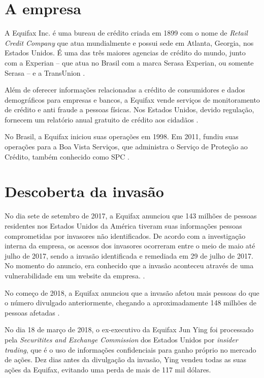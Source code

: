 \documentclass[conference]{IEEEtran}
\begin{document}
\section{A empresa}
A Equifax Inc. é uma bureau de crédito criada em 1899 com o nome de \textit{Retail Credit Company} que atua mundialmente e possui sede em Atlanta, Georgia, nos Estados Unidos. 
É uma das três maiores agencias de crédito do mundo, junto com a Experian -- que atua no Brasil com a marca Serasa Experian,
ou somente Serasa -- e a TransUnion \cite{Roos2008}.

Além de oferecer informações relacionadas a crédito de consumidores e dados demográficos para empresas e bancos, a Equifax
vende serviços de monitoramento de crédito e anti fraude a pessoas físicas. Nos Estados Unidos, devido regulação, fornecem um
relatório anual gratuito de crédito aos cidadãos \cite{Roos2008} \cite{Garkinkel1995}. 

No Brasil, a Equifax iniciou suas operações em 1998. Em 2011, fundiu suas operações para a Boa Vista Serviços, que administra o Serviço de Proteção ao Crédito, também conhecido
como SPC \cite{BoaVista2018} \cite{Sandrini2011}. 

\section{Descoberta da invasão} 
No dia sete de setembro de 2017, a Equifax anunciou que 143 milhões de pessoas residentes nos Estados Unidos da América tiveram suas informações pessoas comprometidas por invasores 
não identificados. De acordo com a investigação interna da empresa, os acessos dos invasores ocorreram entre o meio de maio até julho de 2017, sendo a invasão identificada e remediada 
em 29 de julho de 2017. No momento do anuncio, era conhecido que a invasão aconteceu através de uma vulnerabilidade em um website da empresa. \cite{Carman2017} \cite{Equifax2017} \cite{Bernard2017} \cite{Moore2017}.

No começo de 2018, a Equifax anunciou que a invasão afetou mais pessoas do que o número divulgado anteriormente, chegando a aproximadamente 148 milhões de pessoas afetadas \cite{Whittaker2018} \cite{Borak2018} \cite{Clements2018}.

No dia 18 de março de 2018, o ex-executivo da Equifax Jun Ying foi processado pela \textit{Securitites and Exchange Commission} dos Estados Unidos por \textit{insider trading}, que é o uso de informações confidenciais
para ganho próprio no mercado de ações. Dez dias antes da divulgação da invasão, Ying vendeu todas as suas ações da Equifax, evitando uma perda de mais de 117 mil dólares. 
\end{document}
